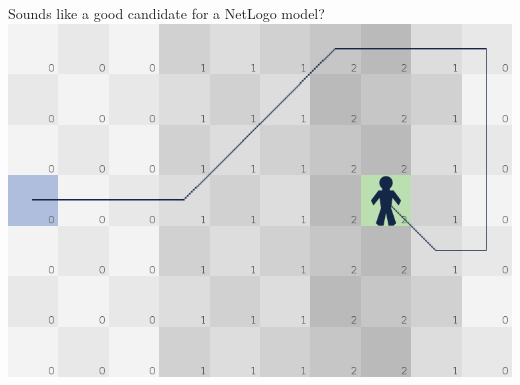 \documentclass[aspectratio=169]{beamer}
\begin{document}
\begin{frame}{Sounds like a good candidate for a NetLogo model?}
  \vfill
  \centering\includegraphics[height=0.8\textheight]{rl_view}
  \vfill
\end{frame}
\end{document}

